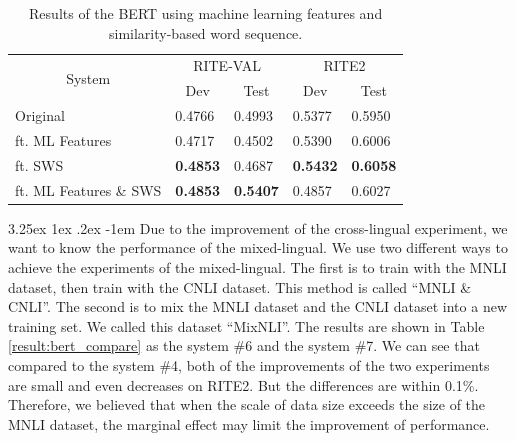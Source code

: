 \documentclass[12pt]{article}
\makeatletter
\renewcommand\paragraph{\@startsection{paragraph}{5}{\z@}%
  {3.25ex \@plus1ex \@minus.2ex}%
  {-1em}%
  {\normalfont\normalsize\bfseries}}
\makeatother
\begin{document}
\begin{CJK*}{UTF8}{bkai}
\begin{spacing}{1.77}
\begin{table}[H]
  \centering
  \setlength{\extrarowheight}{-3pt}
  \caption{Results of the BERT using machine learning features and similarity-based word sequence.}
  \label{result:bert_csa_mlft_comparison}
  \begin{tabular}{|l|l|l|l|l|}
  \hline
  \multicolumn{1}{|c|}{\multirow{2}{*}{System}} & \multicolumn{2}{c|}{RITE-VAL} & \multicolumn{2}{c|}{RITE2} \\ \cline{2-5}
  \multicolumn{1}{|c|}{} & \multicolumn{1}{c|}{Dev} & \multicolumn{1}{c|}{Test} & \multicolumn{1}{c|}{Dev} & \multicolumn{1}{c|}{Test} \\ \hline
  Original & 0.4766 & 0.4993 & 0.5377 & 0.5950 \\ \hline
  ft. ML Features & 0.4717 & 0.4502 & 0.5390 & 0.6006 \\ \hline
  ft. SWS & \textbf{0.4853} & 0.4687 & \textbf{0.5432} & \textbf{0.6058} \\ \hline
  ft. ML Features \& SWS & \textbf{0.4853} & \textbf{0.5407} & 0.4857 & 0.6027 \\ \hline
  \end{tabular}
\end{table}

\paragraph{}
Due to the improvement of the cross-lingual experiment, we want to know the performance of the mixed-lingual. We use two different ways to achieve the experiments of the mixed-lingual. The first is to train with the MNLI dataset, then train with the CNLI dataset. This method is called ``MNLI \& CNLI''. The second is to mix the MNLI dataset and the CNLI dataset into a new training set. We called this dataset ``MixNLI''. The results are shown in Table \ref{result:bert_compare} as the system \#6 and the system \#7. We can see that compared to the system \#4, both of the improvements of the two experiments are small and even decreases on RITE2. But the differences are within 0.1\%. Therefore, we believed that when the scale of data size exceeds the size of the MNLI dataset, the marginal effect may limit the improvement of performance.


\end{spacing}
\end{CJK*}
\end{document}
